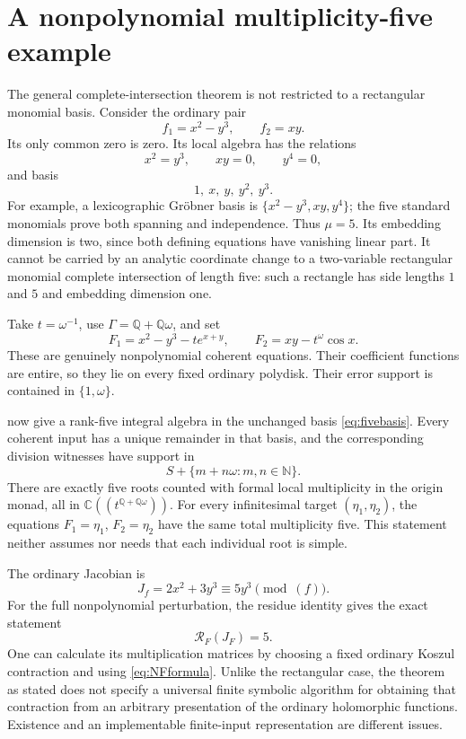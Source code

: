 \documentclass[11pt,letterpaper]{article}
\theoremstyle{definition}
\theoremstyle{remark}
\newcommand{\C}{\mathbb C}
\newcommand{\N}{\mathbb N}
\newcommand{\Q}{\mathbb Q}
\newcommand{\RR}{\mathcal R}
\begin{document}
\section{A nonpolynomial multiplicity-five example}
\label{sec:examplefive}

The general complete-intersection theorem is not restricted to a rectangular monomial basis. Consider the ordinary pair
\[
 f_1=x^2-y^3,\qquad f_2=xy.
\]
Its only common zero is zero. Its local algebra has the relations
\[
 x^2=y^3,\qquad xy=0,\qquad y^4=0,
\]
and basis
\begin{equation}\label{eq:fivebasis}
 1,\ x,\ y,\ y^2,\ y^3.
\end{equation}
For example, a lexicographic Gr\"obner basis is
$\{x^2-y^3,xy,y^4\}$; the five standard monomials prove both spanning and independence. Thus $\mu=5$. Its embedding dimension is two, since both defining equations have vanishing linear part. It cannot be carried by an analytic coordinate change to a two-variable rectangular monomial complete intersection of length five: such a rectangle has side lengths $1$ and $5$ and embedding dimension one.

Take $t=\omega^{-1}$, use $\Gamma=\Q+\Q\omega$, and set
\begin{equation}\label{eq:fiveperturb}
 F_1=x^2-y^3-t e^{x+y},\qquad
 F_2=xy-t^\omega\cos x.
\end{equation}
These are genuinely nonpolynomial coherent equations. Their coefficient functions are entire, so they lie on every fixed ordinary polydisk. Their error support is contained in $\{1,\omega\}$.

 now give a rank-five integral algebra in the unchanged basis \eqref{eq:fivebasis}. Every coherent input has a unique remainder in that basis, and the corresponding division witnesses have support in
\[
 S+\{m+n\omega:m,n\in\N\}.
\]
There are exactly five roots counted with formal local multiplicity in the origin monad, all in $\C((t^{\Q+\Q\omega}))$. For every infinitesimal target $(\eta_1,\eta_2)$, the equations $F_1=\eta_1$, $F_2=\eta_2$ have the same total multiplicity five. This statement neither assumes nor needs that each individual root is simple.

The ordinary Jacobian is
\[
 J_f=2x^2+3y^3\equiv5y^3\pmod{(f)}.
\]
For the full nonpolynomial perturbation, the residue identity gives the exact statement
\[
 \RR_F(J_F)=5.
\]
One can calculate its multiplication matrices by choosing a fixed ordinary Koszul contraction and using \eqref{eq:NFformula}. Unlike the rectangular case, the theorem as stated does not specify a universal finite symbolic algorithm for obtaining that contraction from an arbitrary presentation of the ordinary holomorphic functions. Existence and an implementable finite-input representation are different issues.
\end{document}
